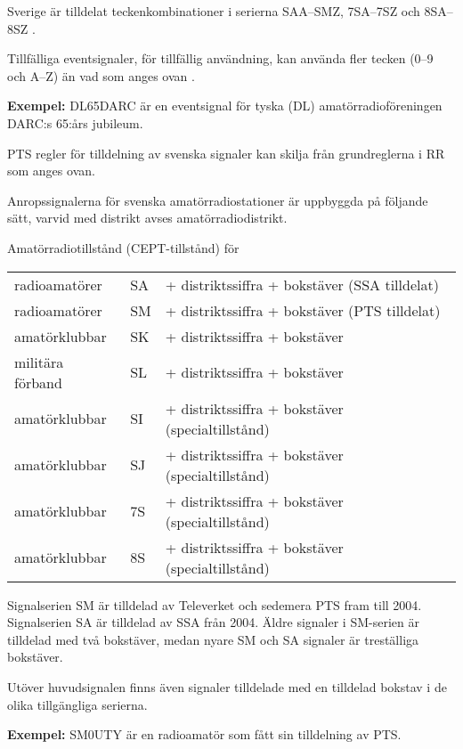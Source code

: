 Sverige är tilldelat teckenkombinationer i serierna SAA--SMZ, 7SA--7SZ och
8SA--8SZ \cite[Appendix 42]{ITU-RR}.

Tillfälliga eventsignaler, för tillfällig användning, kan använda fler tecken
(0--9 och A--Z) än vad som anges ovan \cite[§19.68A]{ITU-RR}.

\textbf{Exempel:} DL65DARC är en eventsignal för tyska (DL)
amatörradioföreningen DARC:s 65:års jubileum.

PTS regler för tilldelning av svenska signaler kan skilja från grundreglerna
i RR som anges ovan.

Anropssignalerna för svenska amatörradiostationer är uppbyggda på följande
sätt, varvid med distrikt avses amatörradiodistrikt.

Amatörradiotillstånd (CEPT-tillstånd) för

\begin{tabular}{lll}
radioamatörer & SA & + distriktssiffra + bokstäver (SSA tilldelat) \\
radioamatörer & SM & + distriktssiffra + bokstäver (PTS tilldelat) \\
amatörklubbar & SK & + distriktssiffra + bokstäver \\
militära förband & SL & + distriktssiffra + bokstäver \\
amatörklubbar & SI & + distriktssiffra + bokstäver (specialtillstånd) \\
amatörklubbar & SJ & + distriktssiffra + bokstäver (specialtillstånd) \\
amatörklubbar & 7S & + distriktssiffra + bokstäver (specialtillstånd) \\
amatörklubbar & 8S & + distriktssiffra + bokstäver (specialtillstånd) \\
\end{tabular}

Signalserien SM är tilldelad av Televerket och sedemera PTS fram till 2004.
Signalserien SA är tilldelad av SSA från 2004. Äldre signaler i SM-serien är
tilldelad med två bokstäver, medan nyare SM och SA signaler är treställiga
bokstäver.

Utöver huvudsignalen finns även signaler tilldelade med en tilldelad
bokstav i de olika tillgängliga serierna.

\textbf{Exempel:} SM0UTY är en radioamatör som fått sin tilldelning av PTS.

